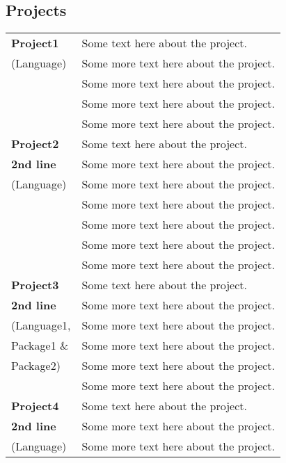\documentclass[11pt]{article} 						%
\begin{document}
\begin{multicols}{2}
{{\begin{minipage}[t][\paperheight]{.55\textwidth}
\section{\faSave[regular]{} Projects}
\begin{tabular*}{\textwidth}{@{\hspace{.5em}}l|l@{\hspace{.5em}}}
	\color{jobTitleText}\textbf{Project1} 			& Some text here about the project.\\
	\color{lightText}(Language) 					& Some more text here about the project.\\
	\hfill 											& Some more text here about the project.\\
	\hfill 											& Some more text here about the project.\\
	\hfill 											& Some more text here about the project.\vspace{1.5ex}\\
	\color{jobTitleText}\textbf{Project2} 			& Some text here about the project.\\
	\color{jobTitleText}\textbf{2nd line} 			& Some more text here about the project.\\
	\color{lightText} (Language) 					& Some more text here about the project.\\
	\hfill 											& Some more text here about the project.\\
	\hfill 											& Some more text here about the project.\\
	\hfill 											& Some more text here about the project.\\
	\hfill 											& Some more text here about the project.\vspace{1.5ex}\\
	\color{jobTitleText}\textbf{Project3} 			& Some text here about the project.\\
	\color{jobTitleText}\textbf{2nd line} 			& Some more text here about the project.\\
	\color{lightText} (Language1, 					& Some more text here about the project.\\
	\color{lightText} Package1 \& 		 			& Some more text here about the project.\\
	\color{lightText} Package2)						& Some more text here about the project.\\
	\hfill 											& Some more text here about the project.\vspace{1.5ex}\\
	\color{jobTitleText}\textbf{Project4} 			& Some text here about the project.\\
	\color{jobTitleText}\textbf{2nd line} 			& Some more text here about the project.\\
	\color{lightText} (Language) 					& Some more text here about the project.\\
\end{tabular*}
%
\end{minipage}}}
\end{multicols}
\end{document}
